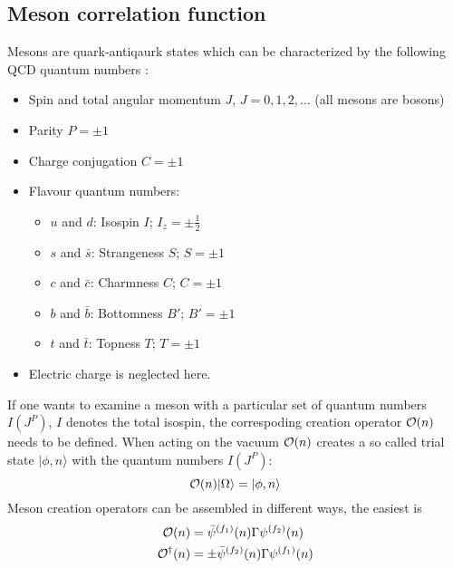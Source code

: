 \subsection{Meson correlation function}
    Mesons are quark-antiqaurk states which can be characterized by the following QCD quantum numbers \cite{introduction_to_lattice_hadron_spectroscopy}:
    \begin{itemize}
        \item Spin and total angular momentum $J$, $J = 0, 1, 2,...$ (all mesons are bosons)
        \item Parity $P = \pm1$
        \item Charge conjugation $C = \pm1$
        \item Flavour quantum numbers:
            \begin{itemize}
                \item $u$ and $d$: Isospin $I$; $I_z = \pm\frac{1}{2}$
                \item $s$ and $\bar{s}$: Strangeness $S$; $S = \pm 1$
                \item $c$ and $\bar{c}$: Charmness $C$; $C = \pm 1$
                \item $b$ and $\bar{b}$: Bottomness $B'$; $B' = \pm 1$
                \item $t$ and $\bar{t}$: Topness $T$; $T = \pm 1$
            \end{itemize}
        \item Electric charge is neglected here.
    \end{itemize}
    If one wants to examine a meson with a particular set of quantum numbers $I(J^P)$, $I$ denotes the total isospin, the correspoding creation operator $\mathcal{O}(n)$ needs to be defined. When acting on the vacuum $\mathcal{O}(n)$ creates a so called trial state $|\phi,n\rangle$ with the quantum numbers $I(J^P)$:
    \begin{equation}
        \mathcal{O}(n)|\Omega\rangle = |\phi,n\rangle
    \end{equation}
    Meson creation operators can be assembled in different ways, the easiest is
    \begin{equation}\label{meson_creation_operator}
        \begin{aligned}
            \mathcal{O}(n) &= \bar{\psi}^{(f_1)}(n)\Gamma\psi^{(f_2)}(n)\\
            \mathcal{O}^\dagger(n) &= \pm\bar{\psi}^{(f_2)}(n)\Gamma\psi^{(f_1)}(n)
        \end{aligned}
    \end{equation}
